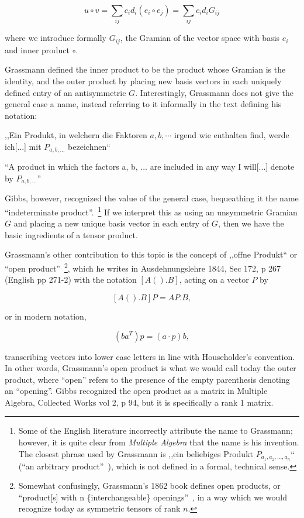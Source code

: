 \[
u \circ v = \sum_{ij} c_i d_i (e_i \circ e_j) = \sum_{ij} c_i d_i G_{ij}
\]

where we introduce formally $G_{ij}$, the Gramian of the vector space with basis ${e_i}$ and inner product $\circ$.

Grassmann defined the inner product to be the product whose Gramian is the identity, and the outer product by placing new basis vectors in each uniquely defined entry of an antisymmetric $G$. Interestingly, Grassmann does not give the general case a name, instead referring to it informally in the text defining his notation:

,,Ein Produkt, in welchern die Faktoren $a, b, \cdots$ irgend wie enthalten find, werde ich[...] mit $P_{a,b,...}$ bezeichnen`` \cite[p. 24, \S 43]{Grassmann1862}

``A product in which the factors a, b, ... are included in any way I will[...] denote by $P_{a,b,...}$''~\cite[p. 22, \S 43]{Grassmann2000}

Gibbs, however, recognized the value of the general case, bequeathing it the name ``indeterminate product''.~\footnote{Some of the English literature incorrectly attribute the name to Grassmann; however, it is quite clear from \textit{Multiple Algebra} that the name is his invention. The closest phrase used by Grassmann is ,,ein beliebiges Produkt $P_{a_1, a_2, ..., a_n}$`` (``an arbitrary product''~\cite[p. 196, \S 353]{Grassmann2000}), which is not defined in a formal, technical sense.} If we interpret this as using an unsymmetric Gramian $G$ and placing a new unique basis vector in each entry of $G$, then we have the basic ingredients of a tensor product.

Grassmann's other contribution to this topic is the concept of ,,offne Produkt`` or ``open product''~\footnote{Somewhat confusingly, Grassmann's 1862 book defines open products, or ``product[s] with n \{interchangeable\} openings''~\cite[\S\S 353, p. 196]{Grassmann2000}, in a way which we would recognize today as symmetric tensors of rank $n$.}, which he writes in Ausdehnungslehre 1844, Sec 172, p 267 (English pp 271-2) with the notation $[A() . B]$, acting on a vector $P$ by

\[
[A() . B] P = AP . B,
\]

or in modern notation,

\[
(b a^T) p = (a\cdot p) b,
\]

transcribing vectors into lower case letters in line with Householder's convention. In other words, Grassmann's open product is what we would call today the outer product, where ``open'' refers to the presence of the empty parenthesis denoting an ``opening''. Gibbs recognized the open product as a matrix in Multiple Algebra, Collected Works vol 2, p 94, but it is specifically a rank 1 matrix. 

